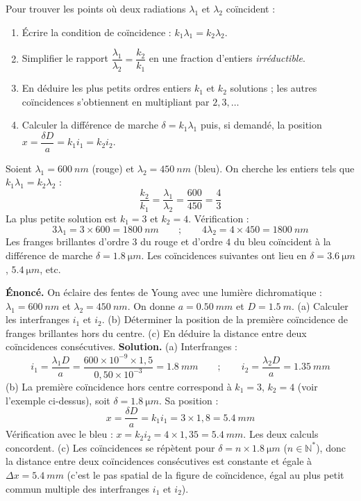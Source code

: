 \documentclass[11pt]{article}
\begin{document}
\begin{methode}
Pour trouver les points où deux radiations $\lambda_1$ et $\lambda_2$ coïncident :
\begin{enumerate}
\item Écrire la condition de coïncidence : $k_1 \lambda_1 = k_2 \lambda_2$.
\item Simplifier le rapport $\dfrac{\lambda_1}{\lambda_2} = \dfrac{k_2}{k_1}$ en une fraction d'entiers \emph{irréductible}.
\item En déduire les plus petits ordres entiers $k_1$ et $k_2$ solutions ; les autres coïncidences s'obtiennent en multipliant par $2, 3, \dots$
\item Calculer la différence de marche $\delta = k_1\lambda_1$ puis, si demandé, la position $x = \dfrac{\delta D}{a} = k_1 i_1 = k_2 i_2$.
\end{enumerate}
\end{methode}

\begin{exemplebox}
Soient $\lambda_1 = \SI{600}{nm}$ (rouge) et $\lambda_2 = \SI{450}{nm}$ (bleu). On cherche les entiers tels que $k_1 \lambda_1 = k_2 \lambda_2$ :
\[ \frac{k_2}{k_1} = \frac{\lambda_1}{\lambda_2} = \frac{600}{450} = \frac{4}{3} \]
La plus petite solution est $k_1 = 3$ et $k_2 = 4$. Vérification :
\[ 3\lambda_1 = 3 \times 600 = \SI{1800}{nm} \qquad ; \qquad 4\lambda_2 = 4 \times 450 = \SI{1800}{nm} \]
Les franges brillantes d'ordre $3$ du rouge et d'ordre $4$ du bleu coïncident à la différence de marche $\delta = \SI{1,8}{\micro m}$. Les coïncidences suivantes ont lieu en $\delta = \SI{3,6}{\micro m}$, $\SI{5,4}{\micro m}$, etc.
\end{exemplebox}

\begin{exoresolu}
\textbf{Énoncé.} On éclaire des fentes de Young avec une lumière dichromatique : $\lambda_1 = \SI{600}{nm}$ et $\lambda_2 = \SI{450}{nm}$. On donne $a = \SI{0,50}{mm}$ et $D = \SI{1,5}{m}$. (a) Calculer les interfranges $i_1$ et $i_2$. (b) Déterminer la position de la première coïncidence de franges brillantes hors du centre. (c) En déduire la distance entre deux coïncidences consécutives.
\tcblower
\textbf{Solution.}
(a) Interfranges :
\[ i_1 = \frac{\lambda_1 D}{a} = \frac{600\times 10^{-9}\times 1{,}5}{0{,}50\times 10^{-3}} = \SI{1,8}{mm} \qquad ; \qquad i_2 = \frac{\lambda_2 D}{a} = \SI{1,35}{mm} \]
(b) La première coïncidence hors centre correspond à $k_1 = 3$, $k_2 = 4$ (voir l'exemple ci-dessus), soit $\delta = \SI{1,8}{\micro m}$. Sa position :
\[ x = \frac{\delta D}{a} = k_1 i_1 = 3 \times 1{,}8 = \SI{5,4}{mm} \]
Vérification avec le bleu : $x = k_2 i_2 = 4 \times 1{,}35 = \SI{5,4}{mm}$. Les deux calculs concordent.
(c) Les coïncidences se répètent pour $\delta = n \times \SI{1,8}{\micro m}$ ($n \in \mathbb{N}^*$), donc la distance entre deux coïncidences consécutives est constante et égale à $\Delta x = \SI{5,4}{mm}$ (c'est le pas spatial de la figure de coïncidence, égal au plus petit commun multiple des interfranges $i_1$ et $i_2$).
\end{exoresolu}
\end{document}

